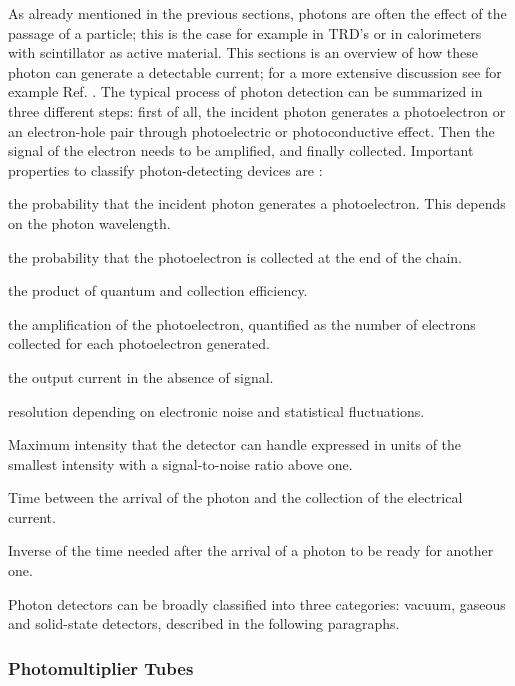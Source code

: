 As already mentioned in the previous sections, photons are often the effect of the passage of a particle; this is the case for example in TRD's or in calorimeters with scintillator as active material. This sections is an overview of how these photon can generate a detectable current; for a more extensive discussion see for example Ref. \cite{lightdetection,Grupen:2012zpa}. The typical process of photon detection can be summarized in three different steps: first of all, the incident photon generates a photoelectron or an electron-hole pair through photoelectric or photoconductive effect. Then the signal of the electron needs to be amplified, and finally collected. Important properties to classify photon-detecting devices are \cite{Patrignani:2016xqp}:
\begin{description}[font=\normalfont]
\item[\textit{Quantum efficiency}:] the probability that the incident photon generates a photoelectron. This depends on the photon wavelength.
\item[\textit{Collection efficiency}:] the probability that the photoelectron is collected at the end of the chain.
\item[\textit{Photon detection efficiency}:] the product of quantum and collection efficiency.
\item[\textit{Gain}:] the amplification of the photoelectron, quantified as the number of electrons collected for each photoelectron generated.
\item[\textit{Dark current or dark noise}:] the output current in the absence of signal.
\item[\textit{Energy resolution}:] resolution depending on electronic noise and statistical fluctuations.
\item[\textit{Dynamic range}:] Maximum intensity that the detector can handle expressed in units of the smallest intensity with a signal-to-noise ratio above one.
\item[\textit{Time dependence}] Time between the arrival of the photon and the collection of the electrical current.
\item[\textit{Rate capability}] Inverse of the time needed after the arrival of a photon to be ready for another one.
\end{description}

Photon detectors can be broadly classified into three categories: vacuum, gaseous and solid-state detectors, described in the following paragraphs.

\subsubsection*{Photomultiplier Tubes}  

